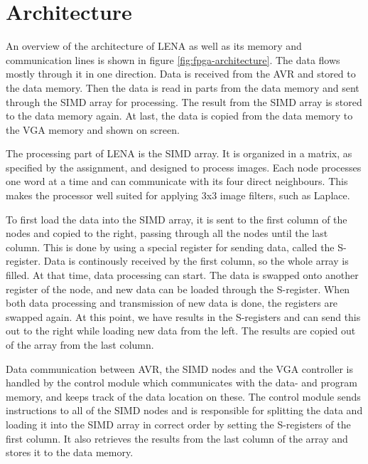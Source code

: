 \section{Architecture}




An overview of the architecture of LENA as well as its memory and communication
lines is shown in figure \ref{fig:fpga-architecture}. The data flows mostly
through it in one direction. Data is received from the AVR and stored to the
data memory. Then the data is read in parts from the data memory and sent
through the SIMD array for processing. The result from the SIMD array is stored
to the data memory again. At last, the data is copied from the data memory to
the VGA memory and shown on screen.

The processing part of LENA is the SIMD array. It is organized in a matrix, as
specified by the assignment, and designed to process images. Each node processes
one word at a time and can communicate with its four direct neighbours. This
makes the processor well suited for applying 3x3 image filters, such as Laplace.

To first load the data into the SIMD array, it is sent to the first column of
the nodes and copied to the right, passing through all the nodes until the last
column.  This is done by using a special register for sending data, called the
S-register. Data is continously received by the first column, so the whole array
is filled. At that time, data processing can start. The data is swapped onto
another register of the node, and new data can be loaded through the S-register.
When both data processing and transmission of new data is done, the registers
are swapped again. At this point, we have results in the S-registers and can
send this out to the right while loading new data from the left. The results are
copied out of the array from the last column.

Data communication between AVR, the SIMD nodes and the VGA controller is handled
by the control module which communicates with the data- and program memory, and
keeps track of the data location on these. The control module sends instructions
to all of the SIMD nodes and is responsible for splitting the data and loading
it into the SIMD array in correct order by setting the S-registers of the first
column. It also retrieves the results from the last column of the array and
stores it to the data memory.

